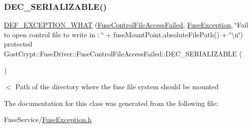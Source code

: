 \subsubsection{\texorpdfstring{D\+E\+C\+\_\+\+S\+E\+R\+I\+A\+L\+I\+Z\+A\+B\+L\+E()}{DEC\_SERIALIZABLE()}}
{\footnotesize\ttfamily \hyperlink{_gost_crypt_exception_8h_a5bc1e1c6c9d6f46c84eeba49e33355f9}{D\+E\+F\+\_\+\+E\+X\+C\+E\+P\+T\+I\+O\+N\+\_\+\+W\+H\+AT} (\hyperlink{class_gost_crypt_1_1_fuse_driver_1_1_fuse_control_file_access_failed}{Fuse\+Control\+File\+Access\+Failed}, \hyperlink{class_gost_crypt_1_1_fuse_driver_1_1_fuse_exception}{Fuse\+Exception}, \char`\"{}Fail to open control file to write in \+: \char`\"{} + fuse\+Mount\+Point.\+absolute\+File\+Path() + \char`\"{}\textbackslash{}n\char`\"{}) protected Gost\+Crypt\+::\+Fuse\+Driver\+::\+Fuse\+Control\+File\+Access\+Failed\+::\+D\+E\+C\+\_\+\+S\+E\+R\+I\+A\+L\+I\+Z\+A\+B\+LE (\begin{DoxyParamCaption}\item[{\hyperlink{class_gost_crypt_1_1_fuse_driver_1_1_fuse_control_file_access_failed}{Fuse\+Control\+File\+Access\+Failed}}]{ }\end{DoxyParamCaption})}

$<$ Path of the directory where the fuse file system should be mounted 

The documentation for this class was generated from the following file\+:\begin{DoxyCompactItemize}
\item 
Fuse\+Service/\hyperlink{_fuse_exception_8h}{Fuse\+Exception.\+h}\end{DoxyCompactItemize}
